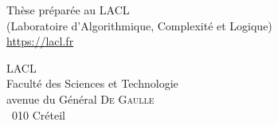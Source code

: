 \cleardoublepage
\setcounter{page}{1}
\mbox{}
\clearpage
\mbox{}
\vfill
\noindent
Thèse préparée au LACL\\
\noindent
(Laboratoire d'Algorithmique, Complexité et Logique)\\
\noindent
\url{https://lacl.fr}

\bigskip

\noindent
LACL\\
\noindent
Faculté des Sciences et Technologie\\
 avenue du Général {\scshape De Gaulle}\\
 010 Créteil
